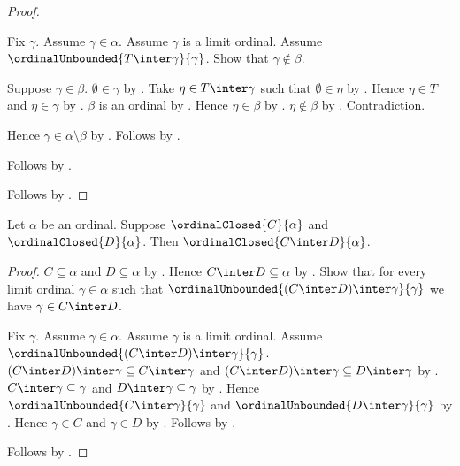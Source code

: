 \begin{proof}
\begin{subproof}
\begin{subproof}
            Fix $\gamma$.
            Assume $\gamma\in\alpha$.
            Assume $\gamma$ is a limit ordinal.
            Assume $\ordinalUnbounded{T\inter\gamma}{\gamma}$.
            Show that $\gamma\notin\beta$.
            \begin{subproof}
                Suppose $\gamma\in\beta$.
                $\emptyset\in\gamma$ by .
                Take $\eta\in T\inter\gamma$ such that $\emptyset\in\eta$
                    by .
                Hence $\eta\in T$ and $\eta\in\gamma$
                    by .
                $\beta$ is an ordinal
                    by .
                Hence $\eta\in\beta$ by .
                $\eta\notin\beta$ by .
                Contradiction.
            \end{subproof}
            Hence $\gamma\in\alpha\setminus\beta$
                by .
            Follows by .
        \end{subproof}
        Follows by .
    \end{subproof}
    Follows by .
\end{proof}

\begin{proposition}\label{ordinal_closed_intersection}
    Let $\alpha$ be an ordinal.
    Suppose $\ordinalClosed{C}{\alpha}$ and
        $\ordinalClosed{D}{\alpha}$.
    Then $\ordinalClosed{C\inter D}{\alpha}$.
\end{proposition}
\begin{proof}
    $C\subseteq\alpha$ and $D\subseteq\alpha$
        by .
    Hence $C\inter D\subseteq\alpha$ by .
    Show that for every limit ordinal $\gamma\in\alpha$ such that
        $\ordinalUnbounded{(C\inter D)\inter\gamma}{\gamma}$
        we have $\gamma\in C\inter D$.
    \begin{subproof}
        Fix $\gamma$.
        Assume $\gamma\in\alpha$.
        Assume $\gamma$ is a limit ordinal.
        Assume $\ordinalUnbounded{(C\inter D)\inter\gamma}{\gamma}$.
        $(C\inter D)\inter\gamma\subseteq C\inter\gamma$ and
            $(C\inter D)\inter\gamma\subseteq D\inter\gamma$
            by .
        $C\inter\gamma\subseteq\gamma$ and $D\inter\gamma\subseteq\gamma$
            by .
        Hence $\ordinalUnbounded{C\inter\gamma}{\gamma}$ and
            $\ordinalUnbounded{D\inter\gamma}{\gamma}$
            by .
        Hence $\gamma\in C$ and $\gamma\in D$
            by .
        Follows by .
    \end{subproof}
    Follows by .
\end{proof}

